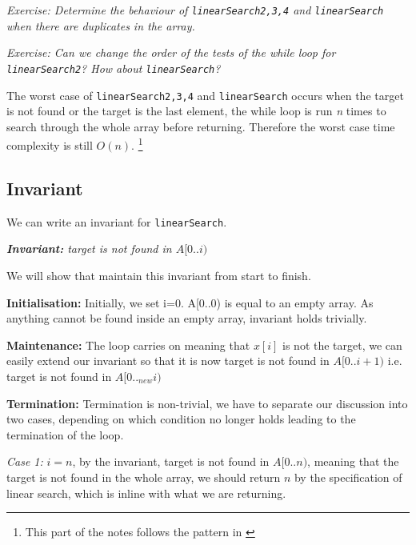 \textit{Exercise: Determine the behaviour of \texttt{linearSearch2,3,4} and \texttt{linearSearch} when there are duplicates in the array.}



\textit{Exercise: Can we change the order of the tests of the while loop for \texttt{linearSearch2}? How about \texttt{linearSearch}?}


The worst case of \texttt{linearSearch2,3,4} and \texttt{linearSearch} occurs when the target is not found or the target is the last element, the while loop is run \textit{n} times to search through the whole array before returning. Therefore the worst case time complexity is still $O(n)$.
\footnote{This part of the notes follows the pattern in \cite{ip:stringsearching}}

\if{}

\subsection*{Invariant}

We can write an invariant for \texttt{linearSearch}.

\begin{center}
    \textit{\textbf{Invariant:}\hspace{6mm} target is not found in $A[0..i)$}
\end{center}

We will show that maintain this invariant from start to finish. 


\textbf{Initialisation:} Initially, we set i=0. A[0..0) is equal to an empty array. As anything cannot be found inside an empty array, invariant holds trivially.


\textbf{Maintenance:} The loop carries on meaning that $x[i]$ is not the target, we can easily extend our invariant so that it is now target is not found in $A[0..i+1)$ i.e. target is not found in $A[0.._{new}i)$


\textbf{Termination:} Termination is non-trivial, we have to separate our discussion into two cases, depending on which condition no longer holds leading to the termination of the loop.

\textit{Case 1:} $i=n$, by the invariant, target is not found in $A[0..n)$, meaning that the target is not found in the whole array, we should return $n$ by the specification of linear search, which is inline with what we are returning.

